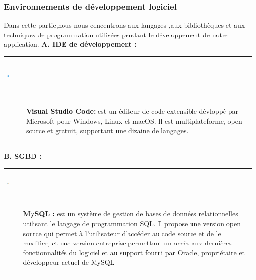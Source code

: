 \documentclass[12pt]{report}
\begin{document}
\subsubsection{Environnements de développement logiciel}
Dans cette partie,nous nous concentrons aux langages ,aux bibliothèques et aux techniques de programmation utilisées pendant le développement de notre application.
\newpage
\textbf{A. IDE de développement :}

\begin{table}[H]

\def\arraystretch{1}
\begin{tabular}{||p{5cm}||p{12cm}||}
   \hline
   \hline
   \vspace{0.8cm}
   \centering
   \includegraphics[width=0.13\textwidth, height=20mm]{visual.png}\\
   \vspace{1cm}
   
   &
   \vspace{0.5cm}
   \begin{doublespace}
    \textbf{Visual Studio Code:} est un éditeur de code extensible dévloppé 
par Microsoft pour Windows, Linux et macOS. Il est multiplateforme, open source et gratuit, supportant une dizaine de langages.\end{doublespace}
   \\
   \hline
   \hline  
\end{tabular} 
\end{table}
\textbf{B. SGBD :} 
\begin{table}[H]
\def\arraystretch{2}
\begin{tabular}{||p{5cm}||p{12cm}||} 
	\hline
	\hline
   \vspace{1.5cm}
   \centering
   \includegraphics[width=0.2\textwidth, height=15mm]{mysql.png}\\
   \vspace{1cm}
   &
   
   \begin{doublespace}
    \textbf{MySQL :} est un système de gestion de bases de données relationnelles utilisant le langage de programmation SQL. Il propose une version open source qui permet à l'utilisateur d'accéder au code source et de le modifier, et une version entreprise permettant un accès aux dernières fonctionnalités du logiciel et au support fourni par Oracle, propriétaire et développeur actuel de MySQL \end{doublespace}
   \\ 
   \hline
   \hline
\end{tabular}   
\end{table}
\end{document}
